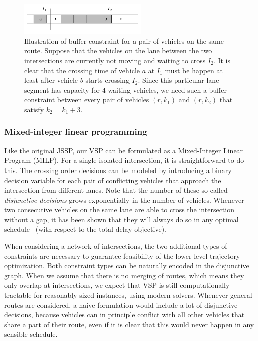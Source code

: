 \documentclass{article}
\theoremstyle{definition}
\theoremstyle{plain}
\begin{document}
\begin{figure}[h]
  \centering
  \includegraphics[width=0.55\textwidth]{figures/buffer_constraints.pdf}
  \caption{Illustration of buffer constraint for a pair of vehicles on the same
    route. Suppose that the vehicles on the lane between the two intersections
    are currently not moving and waiting to cross $I_{2}$. It is clear that the
    crossing time of vehicle $a$ at $I_{1}$ must be happen at least after
    vehicle $b$ starts crossing $I_{2}$. Since this particular lane segment has
    capacity for 4 waiting vehicles, we need such a buffer constraint between
    every pair of vehicles $(r,k_{1})$ and $(r,k_{2})$ that satisfy
    $k_{2} = k_{1} + 3$.}
  \label{fig:buffer_constraints}
  \end{figure}


\subsubsection{Mixed-integer linear programming}

Like the original JSSP, our VSP can be formulated as a Mixed-Integer Linear
Program (MILP).
For a single isolated intersection, it is straightforward to do this. The
crossing order decisions can be modeled by introducing a binary decision
variable for each pair of conflicting vehicles that approach the intersection
from different lanes. Note that the number of these so-called
\textit{disjunctive decisions} grows exponentially in the number of vehicles.
Whenever two consecutive vehicles on the same lane are able to cross the
intersection without a gap, it has been shown that they will always do so in any
optimal schedule~\cite{limpensOnlinePlatoonForming2023} (with respect to the
total delay objective).

When considering a network of intersections, the two additional types of constraints
are necessary to guarantee feasibility of the lower-level trajectory
optimization.
Both constraint types can be naturally encoded in the disjunctive graph.
%
When we assume that there is no merging of routes, which means they only overlap
at intersections, we expect that VSP is still computationally tractable for
reasonably sized instances, using modern solvers. Whenever general routes
are considered, a naive formulation would include a lot of disjunctive
decisions, because vehicles can in principle conflict with all other vehicles
that share a part of their route, even if it is clear that this would never
happen in any sensible schedule.
\end{document}
